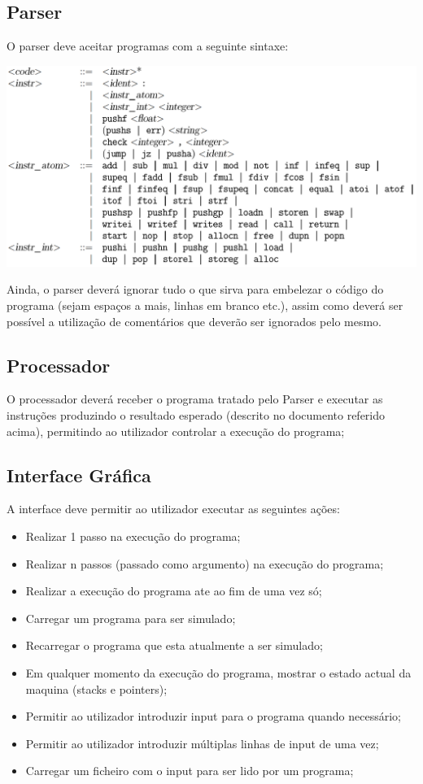\documentclass{report}
\begin{document}
\subsection{Parser}

\quad O parser deve aceitar programas com a seguinte sintaxe:

\begin{center}
\includegraphics[width=\textwidth]{sintaxe.png}
\end{center}

\quad Ainda, o parser deverá ignorar tudo o que sirva para embelezar o código do programa (sejam espaços a mais, linhas em branco etc.),
assim como deverá ser possível a utilização de comentários que deverão ser ignorados pelo mesmo.

\subsection{Processador}

\quad O processador deverá receber o programa tratado pelo Parser e executar as instruções produzindo o resultado
esperado (descrito no documento referido acima), permitindo ao utilizador controlar a execução do programa;

\subsection{Interface Gráfica}
\quad A interface deve permitir ao utilizador executar as seguintes ações:
\begin{itemize}
\item Realizar 1 passo na execução do programa;
\item Realizar n passos (passado como argumento) na execução do programa;
\item Realizar a execução do programa ate ao fim de uma vez só;
\item Carregar um programa para ser simulado;
\item Recarregar o programa que esta atualmente a ser simulado;
\item Em qualquer momento da execução do programa, mostrar o estado actual da maquina (stacks e pointers);
\item Permitir ao utilizador introduzir input para o programa quando necessário;
\item Permitir ao utilizador introduzir múltiplas linhas de input de uma vez;
\item Carregar um ficheiro com o input para ser lido por um programa;
\end{itemize}
\end{document}
